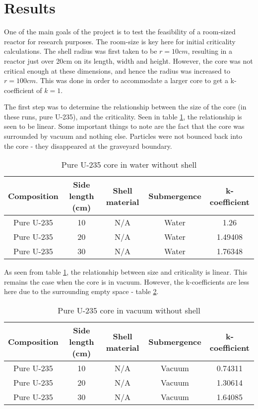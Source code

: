 \label{sec:results}
\section{Results}

One of the main goals of the project is to test the feasibility of a room-sized reactor for research purposes. The room-size is key here for initial criticality calculations. The shell radius was first taken to be $r=10cm$, resulting in a reactor just over 20cm on its length, width and height. However, the core was not critical enough at these dimensions, and hence the radius was increased to $r=100cm$. This was done in order to accommodate a larger core to get a k-coefficient of $k=1$.

The first step was to determine the relationship between the size of the core (in these runs, pure U-235), and the criticality. Seen in table \ref{tab:pure}, the relationship is seen to be linear. Some important things to note are the fact that the core was surrounded by vacuum and nothing else. Particles were not bounced back into the core - they disappeared at the graveyard boundary.
\begin{table}[!htbp]
\centering
\caption{Pure U-235 core in water without shell}
\label{tab:pure}
\begin{tabular}{|c|c|c|c|c|}
\hline
Composition & Side length (cm) & Shell material & Submergence & k-coefficient \\
\hline
Pure U-235  & 10               & N/A            & Water       & 1.26          \\
\hline
Pure U-235  & 20               & N/A            & Water       & 1.49408       \\
\hline
Pure U-235  & 30               & N/A            & Water       & 1.76348       \\
\hline
\end{tabular}
\end{table}
As seen from table \ref{tab:pure}, the relationship between size and criticality is linear. This remains the case when the core is in vacuum. However, the k-coefficients are less here due to the surrounding empty space - table \ref{tab:purevac}.
\begin{table}[!htbp]
\centering
\caption{Pure U-235 core in vacuum without shell}
\label{tab:purevac}
\begin{tabular}{|c|c|c|c|c|}
\hline
Composition & Side length (cm) & Shell material & Submergence & k-coefficient \\
\hline
Pure U-235  & 10               & N/A            & Vacuum       & 0.74311      \\
\hline
Pure U-235  & 20               & N/A            & Vacuum       & 1.30614       \\
\hline
Pure U-235  & 30               & N/A            & Vacuum       & 1.64085       \\
\hline
\end{tabular}
\end{table}
